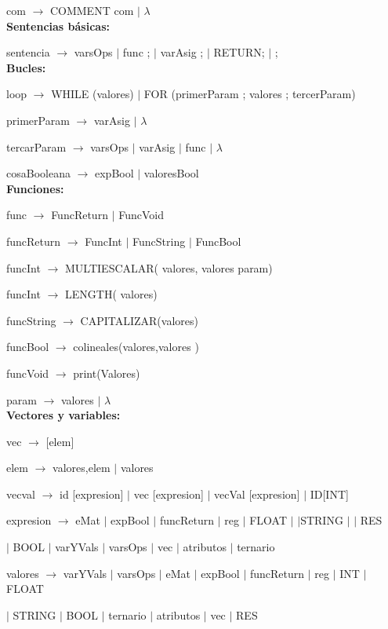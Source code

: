 com $\rightarrow$  COMMENT com $|$ $\lambda$ \\

\textbf{Sentencias básicas:}

sentencia $\rightarrow$ varsOps $|$ func ; $|$ varAsig ; $|$ RETURN; $|$ ; \\


\textbf{Bucles:}

loop $\rightarrow$ WHILE (valores) $|$ FOR (primerParam ; valores ; tercerParam)

primerParam $\rightarrow$  varAsig $|$ $\lambda$

tercarParam $\rightarrow$  varsOps $|$ varAsig $|$ func $|$ $\lambda$

cosaBooleana $\rightarrow$ expBool $|$ valoresBool \\
  

\textbf{Funciones:}

func $\rightarrow$ FuncReturn $|$ FuncVoid

funcReturn $\rightarrow$ FuncInt $|$ FuncString $|$ FuncBool

funcInt $\rightarrow$ MULTIESCALAR( valores, valores param)

funcInt $\rightarrow$ LENGTH( valores)

funcString $\rightarrow$ CAPITALIZAR(valores)

funcBool $\rightarrow$ colineales(valores,valores )

funcVoid $\rightarrow$ print(Valores) 

param $\rightarrow$ valores $|$ $\lambda$ \\

\textbf{Vectores y variables:}

vec $\rightarrow$ [elem]

elem $\rightarrow$ valores,elem $|$ valores

vecval $\rightarrow$ id [expresion] $|$ vec [expresion] $|$ vecVal [expresion] $|$ ID[INT]

expresion $\rightarrow$ eMat
$|$  expBool
$|$  funcReturn
$|$  reg
$|$  FLOAT $|$
$|$STRING $|$
$|$  RES

\hspace{15mm}$|$   BOOL $|$  varYVals $|$  varsOps $|$  vec $|$  atributos $|$  ternario 
 
valores $\rightarrow$  varYVals
$|$  varsOps
$|$  eMat
$|$  expBool
$|$  funcReturn
$|$  reg
$|$  INT
$|$  FLOAT
  
  \hspace{15mm}$|$  STRING
  $|$  BOOL
  $|$  ternario
  $|$  atributos
  $|$  vec
  $|$  RES
 
